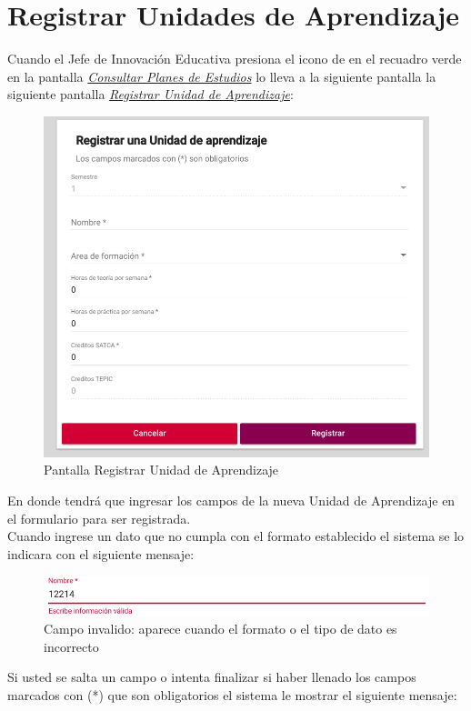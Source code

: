 \section{Registrar Unidades de Aprendizaje}
Cuando el Jefe de Innovación Educativa presiona el icono de \IUbutton{+} en el recuadro verde en la pantalla \hyperlink{consultarUA}{\textit{Consultar Planes de Estudios}} lo lleva a la siguiente pantalla la siguiente pantalla \hyperlink{registrarUA}{\textit{Registrar Unidad de Aprendizaje}}:\\
\begin{figure}[!hbtp]
    \centering
    \hypertarget{registrarUA}{\includegraphics[width=0.7\linewidth]{images/GUA/registrarUA}}
    \caption{Pantalla Registrar Unidad de Aprendizaje}
    \label{registrarUA}
\end{figure}
\newpage
En donde tendrá que ingresar los campos de la nueva Unidad de Aprendizaje en el formulario para ser registrada.\\
Cuando ingrese un dato que no cumpla con el formato establecido el sistema se lo indicara con el siguiente mensaje:\\
\begin{figure}[!hbtp]
    \centering
    \hypertarget{invalidoR}{\includegraphics[width=0.7\linewidth]{images/GUA/invalido}}
    \caption{Campo invalido: aparece cuando el formato o el tipo de dato es incorrecto}
    \label{invalidoR}
\end{figure}
Si usted se salta un campo o intenta finalizar si haber llenado los campos marcados con (*) que son obligatorios el sistema le mostrar el siguiente mensaje:\\
